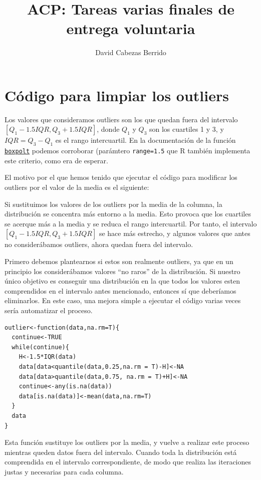 \documentclass[12pt]{article}
\title{ACP: Tareas varias finales de entrega voluntaria}
\author{David Cabezas Berrido}
\date{}
\begin{document}
\maketitle

\section{Código para limpiar los outliers}

Los valores que consideramos outliers son los que quedan fuera del
intervalo $[Q_1-1.5 IQR,Q_3+1.5 IQR]$, donde $Q_1$ y $Q_3$ son los
cuartiles 1 y 3, y $IQR=Q_3-Q_1$ es el rango intercuartil. En la
documentación de la función
\href{https://www.rdocumentation.org/packages/graphics/versions/3.6.2/topics/boxplot}{\texttt{boxpolt}}
podemos corroborar (parámtero \texttt{range=1.5} que R
también implementa este criterio, como era de esperar.

El motivo por el que hemos tenido que ejecutar el código para
modificar los outliers por el valor de la media es el siguiente:

Si sustituimos los valores de los outliers por la media de la columna,
la distribución se concentra más entorno a la media. Esto provoca que
los cuartiles se acerque más a la media y se reduca el rango
intercuartil. Por tanto, el intervalo $[Q_1-1.5 IQR,Q_3+1.5 IQR]$ se
hace más estrecho, y algunos valores que antes no considerábamos
outliers, ahora quedan fuera del intervalo.

Primero debemos plantearnos si estos son realmente outliers, ya que en
un principio los considerábamos valores ``no raros'' de la
distribución. Si nuestro único objetivo es conseguir una distribución
en la que todos los valores esten comprendidos en el intervalo antes
mencionado, entonces sí que deberíamos eliminarlos. En este caso, una
mejora simple a ejecutar el código varias veces sería automatizar el
proceso.

\begin{verbatim}
outlier<-function(data,na.rm=T){
  continue<-TRUE
  while(continue){
    H<-1.5*IQR(data)
    data[data<quantile(data,0.25,na.rm = T)-H]<-NA
    data[data>quantile(data,0.75, na.rm = T)+H]<-NA
    continue<-any(is.na(data))
    data[is.na(data)]<-mean(data,na.rm=T)
  }
  data
}
\end{verbatim}

Esta función sustituye los outliers por la media, y vuelve a realizar
este proceso mientras queden datos fuera del intervalo. Cuando toda la
distribución está comprendida en el intervalo correspondiente, de modo
que realiza las iteraciones justas y necesarias para cada columna.
\end{document}
